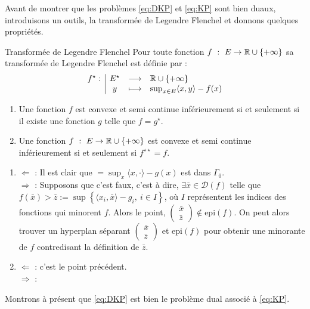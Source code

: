 \documentclass[a4paper,12pt]{article}
\begin{document}
Avant de montrer que les problèmes \eqref{eq:DKP} et \eqref{eq:KP} sont bien duaux, introduisons un outils, la transformée de Legendre Flenchel et donnons quelques propriétés. 
\begin{definition}{Transformée de Legendre Flenchel}
Pour toute fonction $f\ :\ E\rightarrow \mathbb{R}\cup\{+\infty\}$ sa transformée de Legendre Flenchel est définie par :
\begin{align}
\begin{array}[t]{l|ccl} f^{\star}: & E^{\star} & \longrightarrow &  \mathbb{R}\cup\{+\infty\} \\ & y & \longmapsto & \sup_{x\in E}\langle x,y\rangle -f(x) \end{array}
\end{align}
\end{definition}
\begin{propriete}
\begin{enumerate}
\item Une fonction $f$ est convexe et semi continue inférieurement si et seulement si il existe une fonction $g$ telle que $f=g^{\star}$.
\item Une fonction $f\ :\ E\rightarrow \mathbb{R}\cup\{+\infty\}$ est convexe et semi continue inférieurement si et seulement si $f^{\star\star}=f$.
\end{enumerate}
\end{propriete}
\begin{preuve}
\begin{enumerate}
\item $\Longleftarrow$ : Il est clair que $=\sup_x \langle x,\cdot \rangle -g(x)$ est dans $\Gamma_0$. \\
$\Longrightarrow$ : Supposons que c'est faux, c'est à dire, $\exists \bar{x}\in\mathcal{D}(f)$ telle que $f(\bar{x})>\bar{z}:=\sup\left\{\langle x_i,\bar{x}\rangle - g_i,\ i\in I\right\}$, où $I$ représentent les indices des fonctions qui minorent $f$. Alors le point, $\begin{pmatrix}
\bar{x}\\
\bar{z}
\end{pmatrix}\notin \text{epi}(f)$. On peut alors trouver un hyperplan séparant $\begin{pmatrix}
\bar{x}\\
\bar{z}
\end{pmatrix}$ et $\text{epi}(f)$ pour obtenir une minorante de $f$ contredisant la définition de $\bar{z}$.
\item $\Longleftarrow$ : c'est le point précédent.\\
 $\Longrightarrow$ : 
\end{enumerate}
\end{preuve}
Montrons à présent que \eqref{eq:DKP} est bien le problème dual associé à \eqref{eq:KP}. 
\end{document}
